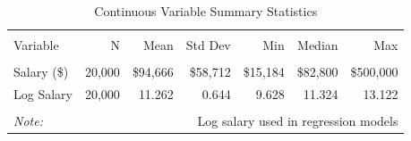 \begin{table}[!htbp] \centering
\caption{Continuous Variable Summary Statistics}
\label{tab:continuous_vars_clean}
\begin{tabular}{lrrrrrr}
\\[-1.8ex]\hline
\hline \\[-1.8ex]
Variable & N & Mean & Std Dev & Min & Median & Max \\
\hline \\[-1.8ex]
Salary (\$) & 20,000 & \$94,666 & \$58,712 & \$15,184 & \$82,800 & \$500,000 \\
Log Salary & 20,000 & 11.262 & 0.644 & 9.628 & 11.324 & 13.122 \\
\hline
\hline \\[-1.8ex]
\textit{Note:} & \multicolumn{6}{r}{Log salary used in regression models} \\
\end{tabular}\end{table}
